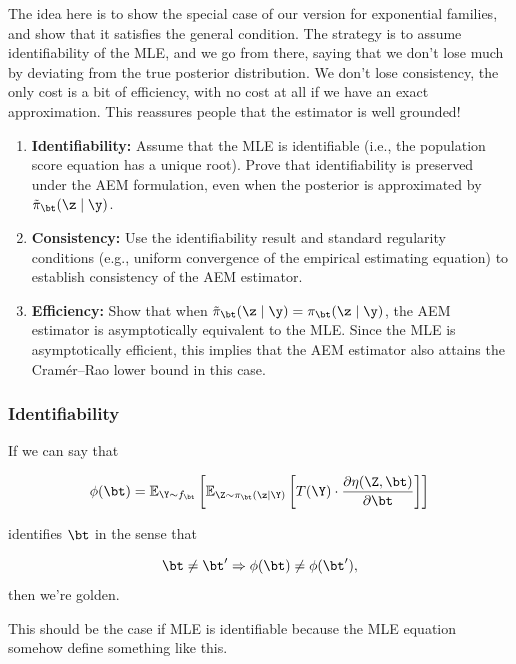 \begin{tcolorbox}[colback=yellow!5!white,colframe=yellow!60!black,title=Main Objective: Deep Dive with Exponential Families]
The idea here is to show the special case of our version for exponential families, and show that it satisfies the general condition. The strategy is to assume identifiability of the MLE, and we go from there, saying that we don't lose much by deviating from the true posterior distribution. We don't lose consistency, the only cost is a bit of efficiency, with no cost at all if we have an exact approximation. This reassures people that the estimator is well grounded!
\begin{enumerate}
    \item \textbf{Identifiability:} Assume that the MLE is identifiable (i.e., the population score equation has a unique root). Prove that identifiability is preserved under the AEM formulation, even when the posterior is approximated by \( \tilde\pi_\bt(\z \mid \y) \).
    
    \item \textbf{Consistency:} Use the identifiability result and standard regularity conditions (e.g., uniform convergence of the empirical estimating equation) to establish consistency of the AEM estimator.
    
    \item \textbf{Efficiency:} Show that when \( \tilde\pi_\bt(\z \mid \y) = \pi_\bt(\z \mid \y) \), the AEM estimator is asymptotically equivalent to the MLE. Since the MLE is asymptotically efficient, this implies that the AEM estimator also attains the Cramér–Rao lower bound in this case.
\end{enumerate}
\end{tcolorbox}

\subsubsection{Identifiability}
If we can say that 

$$
\phi(\bt) = \mathbb{E}_{\Y \sim f_\bt}
\left[
\mathbb{E}_{\Z\sim\pi_\bt(\z \mid \Y)} 
\left[ 
T(\Y) \cdot 
\frac{\partial \eta(\Z, \bt)}{\partial \bt}
\right]
\right]
$$

identifies $\bt$ in the sense that 

$$
\bt \neq \bt' \Rightarrow \phi(\bt)\neq\phi(\bt'),
$$
then we're golden.

This should be the case if MLE is identifiable because the MLE equation somehow define something like this.

